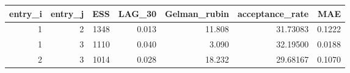 \begin{longtable}{rrrrrrr}
\toprule
entry\_i & entry\_j & ESS & LAG\_30 & Gelman\_rubin & acceptance\_rate & MAE \\ 
\midrule
1 & 2 & 1348 & 0.013 & 11.808 & 31.73083 & 0.1222 \\ 
1 & 3 & 1110 & 0.040 & 3.090 & 32.19500 & 0.0188 \\ 
2 & 3 & 1014 & 0.028 & 18.232 & 29.68167 & 0.1070 \\ 
\bottomrule
\end{longtable}

